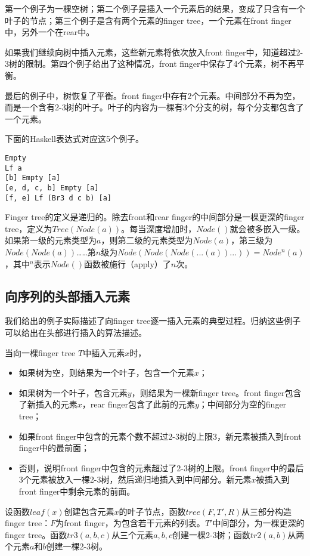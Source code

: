 \documentclass[UTF8]{article}
\begin{document}
第一个例子为一棵空树；第二个例子是插入一个元素后的结果，变成了只含有一个叶子的节点；第三个例子是含有两个元素的finger tree，一个元素在front finger中，另外一个在rear中。

如果我们继续向树中插入元素，这些新元素将依次放入front finger中，知道超过2-3树的限制。第四个例子给出了这种情况，front finger中保存了4个元素，树不再平衡。

最后的例子中，树恢复了平衡。front finger中存有2个元素。中间部分不再为空，而是一个含有2-3树的叶子。叶子的内容为一棵有3个分支的树，每个分支都包含了一个元素。

下面的Haskell表达式对应这5个例子。

\lstset{language=Haskell}
\begin{lstlisting}
Empty
Lf a
[b] Empty [a]
[e, d, c, b] Empty [a]
[f, e] Lf (Br3 d c b) [a]
\end{lstlisting}

Finger tree的定义是递归的。除去front和rear finger的中间部分是一棵更深的finger tree，定义为$Tree(Node(a))$。每当深度增加时，$Node()$就会被多嵌入一级。如果第一级的元素类型为$a$，则第二级的元素类型为$Node(a)$，第三级为$Node(Node(a))$……第$n$级为$Node(Node(Node(...(a))...)) = Node^n(a)$，其中$^n$表示$Node()$函数被施行（apply）了$n$次。

\subsection{向序列的头部插入元素}

我们给出的例子实际描述了向finger tree逐一插入元素的典型过程。归纳这些例子可以给出在头部进行插入的算法描述。

当向一棵finger tree $T$中插入元素$x$时，
\begin{itemize}
\item 如果树为空，则结果为一个叶子，包含一个元素$x$；
\item 如果树为一个叶子，包含元素$y$，则结果为一棵新finger tree。front finger包含了新插入的元素$x$，rear finger包含了此前的元素$y$；中间部分为空的finger tree；
\item 如果front finger中包含的元素个数不超过2-3树的上限3，新元素被插入到front finger中的最前面；
\item 否则，说明front finger中包含的元素超过了2-3树的上限。front finger中的最后3个元素被放入一棵2-3树，然后递归地插入到中间部分。新元素$x$被插入到front finger中剩余元素的前面。
\end{itemize}

设函数$leaf(x)$创建包含元素$x$的叶子节点，函数$tree(F, T', R)$从三部分构造finger tree：$F$为front finger，为包含若干元素的列表。$T'$中间部分，为一棵更深的finger tree。函数$tr3(a, b, c)$从三个元素$a, b, c$创建一棵2-3树；函数$tr2(a, b)$从两个元素$a$和$b$创建一棵2-3树。
\end{document}
